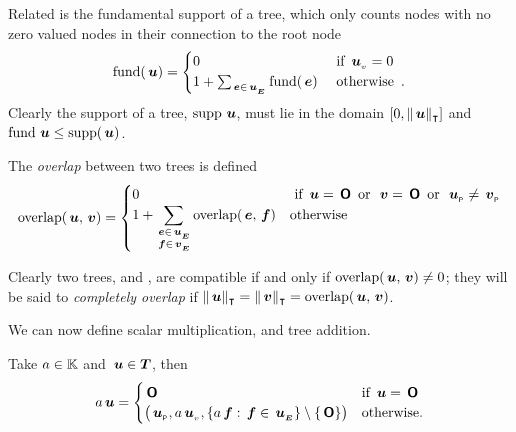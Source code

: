 Related is the fundamental support of a tree, which only counts nodes
with no zero valued nodes in their connection to the root node
  \begin{align*}
    \fund(\node{u}) = \begin{cases}
      0 & \text{ if } \nv{u} = 0 \\
      1 + \sum_{\node{e}\in\extn{u}} \fund(\node{e}) & \otherwise.
    \end{cases}
  \end{align*}
  Clearly the support of a tree, $\supp{\node{u}}$,  must lie in the
  domain $[0,\Tcard{\node{u}}]$ and $\fund{\node{u}} \le \supp(\node{u})$.


The \emph{overlap} between two trees is defined
  \begin{align*}
    \overlap(\node{u},\node{v}) = \begin{cases}
      0 & \text{ if } \node{u} = \nulltree \mor \node{v} = \nulltree \mor \nlabel{u} \neq \nlabel{v} \\
      1 + \displaystyle\sum_{\substack{\node{e}\in\extn{u} \\ \node{f}\in\extn{v}}} \overlap(\node{e},\node{f}) & \text{otherwise}
    \end{cases}
  \end{align*}

  Clearly two trees,  and , are compatible if and only if \(\overlap(\node{u},\node{v}) \neq 0 \); they will
  be said to \emph{completely overlap} if \(\Tcard{\node{u}} = \Tcard{\node{v}} =
  \overlap(\node{u},\node{v})\).



We can now define scalar multiplication, and tree addition.
\begin{definition}\label{defscalar*}
  Take $a \in \FIELD$ and $\node{u} \in \DOM$, then
  \begin{equation}
    a\node{u} = \begin{cases}
      \nulltree & \text{if } \node{u} = \nulltree \\      
      \bigl(\nlabel{u}, a\nv{u}, \{a\node{f}: \node{f} \in \extn{u}\}\setminus\{\nulltree\}\bigr) & \text{otherwise.}
    \end{cases}
  \end{equation}
\end{definition}



